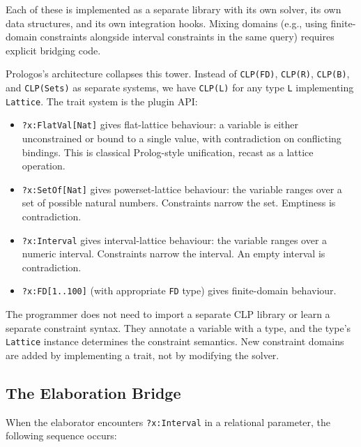 \documentclass[11pt]{article}
\begin{document}
Each of these is implemented as a separate library with its own solver, its own
data structures, and its own integration hooks. Mixing domains (e.g., using
finite-domain constraints alongside interval constraints in the same query)
requires explicit bridging code.

Prologos's architecture collapses this tower. Instead of \texttt{CLP(FD)}, \texttt{CLP(R)},
\texttt{CLP(B)}, and \texttt{CLP(Sets)} as separate systems, we have \texttt{CLP(L)} for any type
\texttt{L} implementing \texttt{Lattice}. The trait system is the plugin API:

\begin{itemize}
\item \texttt{?x:FlatVal[Nat]} gives flat-lattice behaviour: a variable is either
unconstrained or bound to a single value, with contradiction on conflicting
bindings. This is classical Prolog-style unification, recast as a lattice
operation.
\item \texttt{?x:SetOf[Nat]} gives powerset-lattice behaviour: the variable ranges over a
set of possible natural numbers. Constraints narrow the set. Emptiness is
contradiction.
\item \texttt{?x:Interval} gives interval-lattice behaviour: the variable ranges over a
numeric interval. Constraints narrow the interval. An empty interval is
contradiction.
\item \texttt{?x:FD[1..100]} (with appropriate \texttt{FD} type) gives finite-domain behaviour.
\end{itemize}

The programmer does not need to import a separate CLP library or learn a separate
constraint syntax. They annotate a variable with a type, and the type's \texttt{Lattice}
instance determines the constraint semantics. New constraint domains are added by
implementing a trait, not by modifying the solver.
\subsection{The Elaboration Bridge}
\label{sec:orgff24e4a}

When the elaborator encounters \texttt{?x:Interval} in a relational parameter, the
following sequence occurs:
\end{document}

